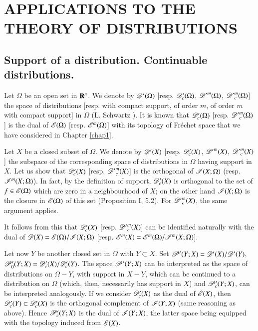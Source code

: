 \chapter{APPLICATIONS TO THE THEORY OF DISTRIBUTIONS}\label{chap7}
\pageoriginale

\section[Support of a distribution. Continuable distributions]{Support of a distribution. Continuable distributions.}\label{chap7-sec1}

Let $\Omega$ be an open set in $\mathbf{R}^{n}$. We denote by $\mathscr{D}'(\Omega)$ [resp. $\mathscr{D}'_{c}(\Omega)$, ${\mathscr{D}'}^{m}(\Omega)$, ${\mathscr{D}'}^{m}_{c}(\Omega)$] the space of distributions [resp. with compact support, of order $m$, of order $m$ with compact support] in $\Omega$ (L. Schwartz \cite{L. Schwartz : 1}). It is known that $\mathscr{D}'_{c}(\Omega)$ [resp. ${\mathscr{D}'}^{m}_{c}(\Omega)$] is the dual of $\mathscr{E}(\Omega)$ [resp. $\mathscr{E}^{m}(\Omega)$] with its topology of Fr\'echet space that we have considered in Chapter \ref{chap1}.

Let $X$ be a closed subset of $\Omega$. We denote by $\mathscr{D}'(X)$ [resp. $\mathscr{D}'_{c}(X)$, ${\mathscr{D}'}^{m}(X)$, ${\mathscr{D}'}^{m}_{c}(X)$] the subspace of the corresponding space of distributions in $\Omega$ having support in $X$. Let us show that $\mathscr{D}'_{c}(X)$ [resp. ${\mathscr{D}'}^{m}_{c}(X)$] is the orthogonal of $\mathscr{I}(X;\Omega)$ (resp. $\mathscr{I}^{m}(X;\Omega)$). In fact, by the definition of support, $\mathscr{D}'_{c}(X)$ is orthogonal to the set of $f\in \mathscr{E}(\Omega)$ which are zero in a neighbourhood of $X$; on the other hand $\mathscr{I}(X;\Omega)$ is the closure in $\mathscr{E}(\Omega)$ of this set (Proposition I, 5.2). For ${\mathscr{D}'}^{m}_{c}(X)$, the same argument applies.

It follows from this that $\mathscr{D}'_{c}(X)$ [resp. ${\mathscr{D}'}^{m}_{c}(X)$] can be identified naturally with the dual of $\mathscr{D}(X)=\mathscr{E}(\Omega)/\mathscr{I}(X;\Omega)$ [resp. $\mathscr{E}^{m}(X)=\mathscr{E}^{m}(\Omega)/\mathscr{I}^{m}(X;\Omega)$].

Let now $Y$ be another closed set in $\Omega$ with $Y\subset X$. Set $\mathscr{P}'(Y;X)=\mathscr{D}'(X)/\mathscr{D}'(Y)$, $\mathscr{P}'_{0}(Y;X)=\mathscr{D}'_{c}(X)/\mathscr{D}'_{c}(Y)$. The space $\mathscr{P}'(Y;X)$ can be interpreted as the space of distributions on $\Omega-Y$, with support in $X-Y$, which can be continued to a distribution on $\Omega$ (which, then, necessarily has support in $X$) and $\mathscr{P}'_{c}(Y;X)$, can be interpreted analogously. If we consider $\mathscr{D}'_{c}(X)$ as the dual of $\mathscr{E}(X)$, then $\mathscr{D}'_{c}(Y)\subset \mathscr{D}'_{c}(X)$ is the orthogonal complement of $\mathscr{I}(Y;X)$ (same reasoning as above). Hence $\mathscr{P}'_{c}(Y;X)$ is the dual of $\mathscr{I}(Y;X)$, the latter space being equipped with the topology induced from $\mathscr{E}(X)$.

